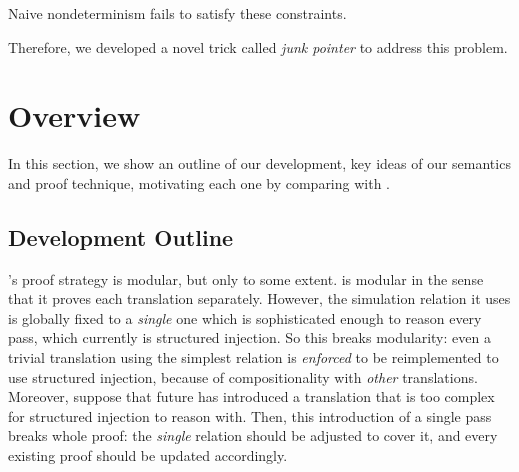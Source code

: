 {Naive nondeterminism fails to satisfy these constraints.

Therefore, we developed a novel trick called \textit{junk pointer} to address this problem.





























\section{Overview}\label{sec:overview}
In this section, we show an outline of our development, key ideas of our semantics and proof technique, motivating each one by comparing with \ccc{}.

\subsection{Development Outline}\label{sec:overview:outline}


\ccc{}'s proof strategy is modular, but only to some extent.%
\ccc{} is modular in the sense that it proves each translation separately.
However, the simulation relation it uses is globally fixed to a \textit{single} one which is sophisticated enough to reason every pass, which currently is structured injection.
So this breaks modularity: even a trivial translation using the simplest relation is \textit{enforced} to be reimplemented to use structured injection, because of compositionality with \textit{other} translations.
Moreover, suppose that future \cc{} has introduced a translation that is too complex for structured injection to reason with.
Then, this introduction of a single pass breaks whole proof: the \textit{single} relation should be adjusted to cover it, and every existing proof should be updated accordingly.

}
